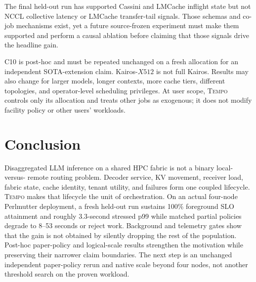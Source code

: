 \documentclass[10pt,twocolumn]{article}
\newcommand{\system}{\textsc{Tempo}\xspace}
\begin{document}
The final held-out run has supported Cassini and LMCache inflight state but not
NCCL collective latency or LMCache transfer-tail signals.  Those schemas and
co-job mechanisms exist, yet a future source-frozen experiment must make them
supported and perform a causal ablation before claiming that those signals
drive the headline gain.

C10 is post-hoc and must be repeated unchanged on a fresh allocation for an
independent SOTA-extension claim.  Kairos-$X512$ is not full Kairos.  Results
may also change for larger models, longer contexts, more cache tiers, different
topologies, and operator-level scheduling privileges.  At user scope, \system
controls only its allocation and treats other jobs as exogenous; it does not
modify facility policy or other users' workloads.

\section{Conclusion}

Disaggregated LLM inference on a shared HPC fabric is not a binary local-versus-
remote routing problem.  Decoder service, KV movement, receiver load, fabric
state, cache identity, tenant utility, and failures form one coupled lifecycle.
\system makes that lifecycle the unit of orchestration.  On an actual
four-node Perlmutter deployment, a fresh held-out run sustains 100\% foreground
SLO attainment and roughly 3.3-second stressed p99 while matched partial
policies degrade to 8--53 seconds or reject work.  Background and telemetry
gates show that the gain is not obtained by silently dropping the rest of the
population.  Post-hoc paper-policy and logical-scale results strengthen the
motivation while preserving their narrower claim boundaries.  The next step is
an unchanged independent paper-policy rerun and native scale beyond four nodes,
not another threshold search on the proven workload.



\end{document}
